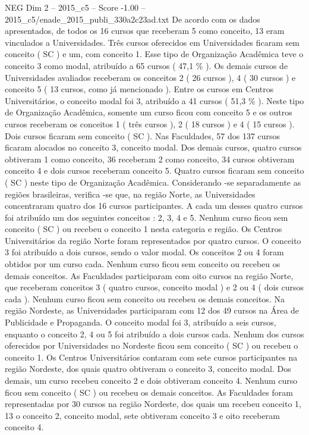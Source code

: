 \begin{textsample}{NEG Dim 2 – 2015\_c5 – Score -1.00 – 2015\_c5/enade\_2015\_publi\_330a2c23ad.txt}
De acordo com os dados apresentados, de todos os 16 cursos que receberam 5 como conceito, 13 eram vinculados a Universidades.
Três cursos oferecidos em Universidades ficaram sem conceito ( SC ) e um, com conceito 1.
Esse tipo de Organização Acadêmica teve o conceito 3 como modal, atribuído a 65 cursos ( 47,1 \% ).
Os demais cursos de Universidades avaliados receberam os conceitos 2 ( 26 cursos ), 4 ( 30 cursos ) e conceito 5 ( 13 cursos, como já mencionado ).
Entre os cursos em Centros Universitários, o conceito modal foi 3, atribuído a 41 cursos ( 51,3 \% ).
Neste tipo de Organização Acadêmica, somente um curso ficou com conceito 5 e os outros cursos receberam os conceitos 1 ( três cursos ), 2 ( 18 cursos ) e 4 ( 15 cursos ).
Dois cursos ficaram sem conceito ( SC ).
Nas Faculdades, 57 dos 137 cursos ficaram alocados no conceito 3, conceito modal.
Dos demais cursos, quatro cursos obtiveram 1 como conceito, 36 receberam 2 como conceito, 34 cursos obtiveram conceito 4 e dois cursos receberam conceito 5.
Quatro cursos ficaram sem conceito ( SC ) neste tipo de Organização Acadêmica.
Considerando -se separadamente as regiões brasileiras, verifica -se que, na região Norte, as Universidades concentraram quatro dos 16 cursos participantes.
A cada um desses quatro cursos foi atribuído um dos seguintes conceitos : 2, 3, 4 e 5.
Nenhum curso ficou sem conceito ( SC ) ou recebeu o conceito 1 nesta categoria e região.
Os Centros Universitários da região Norte foram representados por quatro cursos.
O conceito 3 foi atribuído a dois cursos, sendo o valor modal.
Os conceitos 2 ou 4 foram obtidos por um curso cada.
Nenhum curso ficou sem conceito ou recebeu os demais conceitos.
As Faculdades participaram com oito cursos na região Norte, que receberam conceitos 3 ( quatro cursos, conceito modal ) e 2 ou 4 ( dois cursos cada ).
Nenhum curso ficou sem conceito ou recebeu os demais conceitos.
Na região Nordeste, as Universidades participaram com 12 dos 49 cursos na Área de Publicidade e Propaganda.
O conceito modal foi 3, atribuído a seis cursos, enquanto o conceito 2, 4 ou 5 foi atribuído a dois cursos cada.
Nenhum dos cursos oferecidos por Universidades no Nordeste ficou sem conceito ( SC ) ou recebeu o conceito 1.
Os Centros Universitários contaram com sete cursos participantes na região Nordeste, dos quais quatro obtiveram o conceito 3, conceito modal.
Dos demais, um curso recebeu conceito 2 e dois obtiveram conceito 4.
Nenhum curso ficou sem conceito ( SC ) ou recebeu os demais conceitos.
As Faculdades foram representadas por 30 cursos na região Nordeste, dos quais um recebeu conceito 1, 13 o conceito 2, conceito modal, sete obtiveram conceito 3 e oito receberam conceito 4.

\end{textsample}
